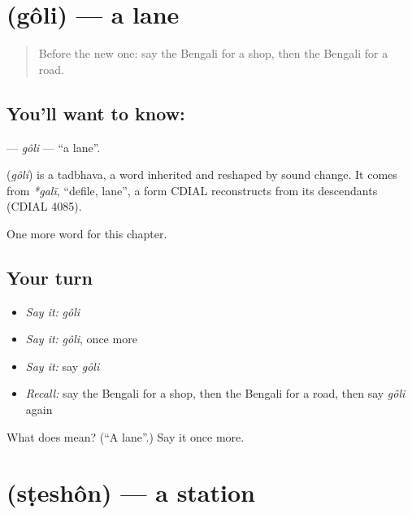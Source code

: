 \section[\texorpdfstring{\bn{গলি} (gôli)}{গলি (gôli)}]{ (gôli) — a lane}

\label{lesson:BN-C82-goli}



\begin{quote}
Before the new one: say the Bengali for a shop, then the Bengali for a road.
\end{quote}

\subsection*{You'll want to know: }
\textbf{} — \emph{gôli} — \textquotedblleft{}a lane\textquotedblright{}.

\begin{cousinweb}
\textbf{} (\emph{gôli}) is a tadbhava, a word inherited and reshaped by sound change. It comes from \emph{*galī}, \textquotedblleft{}defile, lane\textquotedblright{}, a form CDIAL reconstructs from its descendants (CDIAL 4085).
\end{cousinweb}

\begin{grammarlens}[title={What you've built}]
One more word for this chapter.
\end{grammarlens}

\subsection*{Your turn}
\begin{itemize}
\raggedright
  \item \emph{Say it:} \emph{gôli}
  \item \emph{Say it:} \emph{gôli}, once more
  \item \emph{Say it:} say \emph{gôli}
  \item \emph{Recall:} say the Bengali for a shop, then the Bengali for a road, then say \emph{gôli} again
\end{itemize}

\begin{tcolorbox}[breakable,colback=teal!4,colframe=teal!35!black,title={Before you move on}]
What does  mean? (\textquotedblleft{}A lane\textquotedblright{}.) Say it once more.
\end{tcolorbox}
\section[\texorpdfstring{\bn{স্টেশন} (sṭeshôn)}{স্টেশন (sṭeshôn)}]{ (sṭeshôn) — a station}


